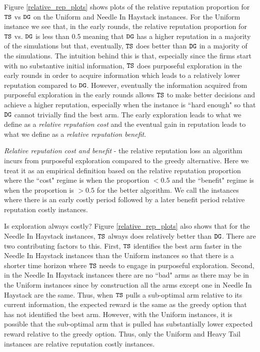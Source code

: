 \documentclass[../competing_bandits.tex]{subfiles}
\begin{document}
Figure \ref{relative_rep_plots} shows plots of the relative reputation proportion for $\mathtt{TS}$ vs $\mathtt{DG}$ on the Uniform and Needle In Haystack instances. For the Uniform instance we see that, in the early rounds, the relative reputation proportion for $\mathtt{TS}$  vs. $\mathtt{DG}$ is less than 0.5 meaning that $\mathtt{DG}$ has a higher reputation in a majority of the simulations  but that, eventually, $\mathtt{TS}$ does better than $\mathtt{DG}$ in a majority of the simulations. The intuition behind this is that, especially since the firms start with no substantive initial information, $\mathtt{TS}$ does purposeful exploration in the early rounds in order to acquire information which leads to a relatively lower reputation compared to $\mathtt{DG}$. However, eventually the information acquired from purposeful exploration in the early rounds allows $\mathtt{TS}$ to make better decisions and achieve a higher reputation, especially when the instance is ``hard enough" so that $\mathtt{DG}$ cannot trivially find the best arm. The early exploration leads to what we define as a \textit{relative reputation cost} and the eventual gain in reputation leads to what we define as a \textit{relative reputation benefit}.

\begin{definition}
\textit{Relative reputation cost and benefit} - the relative reputation loss an algorithm incurs from purposeful exploration compared to the greedy alternative. Here we treat it as an empirical definition based on the relative reputation proportion where the ``cost" regime is when the proportion $< 0.5$ and the ``benefit" regime is when the proportion is $> 0.5$ for the better algorithm. We call the instances where there is an early costly period followed by a later benefit period relative reputation costly instances.
\end{definition}

Is exploration always costly? Figure \ref{relative_rep_plots} also shows that for the Needle In Haystack instances, $\mathtt{TS}$ always does relatively better than $\mathtt{DG}$. There are two contributing factors to this. First, $\mathtt{TS}$ identifies the best arm faster in the Needle In Haystack instances than the Uniform instances so that there is a shorter time horizon where $\mathtt{TS}$ needs to engage in purposeful exploration. Second, in the Needle In Haystack instances there are no ``bad" arms as there may be in the Uniform instances since by construction all the arms except one in Needle In Haystack are the same. Thus, when $\mathtt{TS}$ pulls a sub-optimal arm relative to its current information, the expected reward is the same as the greedy option that has not identified the best arm. However, with the Uniform instances, it is possible that the sub-optimal arm that is pulled has substantially lower expected reward relative to the greedy option. Thus, only the Uniform and Heavy Tail instances are relative reputation costly instances.
\end{document}
